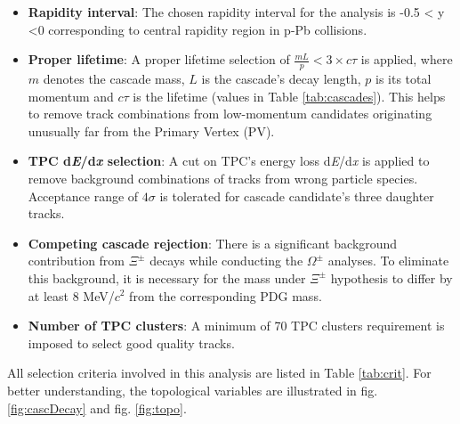 \begin{itemize}
    \item \textbf{Rapidity interval}: The chosen rapidity interval for the analysis is -0.5 < y <0 corresponding to central rapidity region in p-Pb
          collisions.
    \item \textbf{Proper lifetime}: A proper lifetime selection of $\frac{mL}{p} < 3\times c\tau$ is applied, where $m$ denotes the cascade mass, $L$ is the
          cascade's decay length, $p$ is its total momentum and $c\tau$ is the lifetime (values in Table \ref{tab:cascades}). This helps to remove track combinations
          from low-momentum candidates originating unusually far from the Primary Vertex (PV).
    \item \textbf{TPC d\textit{E}/{d}\textit{x} selection}: A cut on TPC's energy loss d\textit{E}/{d}\textit{x}
          is applied to remove background combinations of tracks from wrong particle species. Acceptance range of $4\sigma$
          is tolerated for cascade candidate's three daughter tracks.
    \item \textbf{Competing cascade rejection}: There is a significant background contribution from $\Xi^{\pm}$ decays
          while conducting the $\Omega^{\pm}$ analyses. To eliminate this background, it is necessary for the mass under
          $\Xi^{\pm}$ hypothesis to differ by at least 8 MeV/$c^{2}$ from the corresponding PDG mass.

    \item \textbf{Number of TPC clusters}: A minimum of 70 TPC clusters requirement is imposed to select good quality tracks.

\end{itemize}

All selection criteria involved in this analysis are listed in Table \ref{tab:crit}. For better understanding, the topological variables are illustrated
in fig. \ref{fig:cascDecay} and fig. \ref{fig:topo}.


